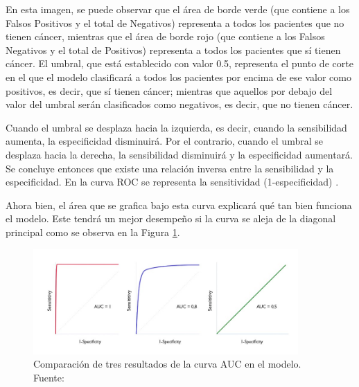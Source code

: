 \begin{itemize}
	En esta imagen, se puede observar que el área de borde verde (que contiene a los Falsos Positivos y el total de Negativos) representa a todos los pacientes que no tienen cáncer, mientras que el área de borde rojo (que contiene a los Falsos Negativos y el total de Positivos) representa a todos los pacientes que sí tienen cáncer. El umbral, que está establecido con valor 0.5, representa el punto de corte en el que el modelo clasificará a todos los pacientes por encima de ese valor como positivos, es decir, que sí tienen cáncer; mientras que aquellos por debajo del valor del umbral serán clasificados como negativos, es decir, que no tienen cáncer.
	
	Cuando el umbral se desplaza hacia la izquierda, es decir, cuando la sensibilidad aumenta, la especificidad disminuirá. Por el contrario, cuando el umbral se desplaza hacia la derecha, la sensibilidad disminuirá y la especificidad aumentará. Se concluye entonces que existe una relación inversa entre la sensibilidad y la especificidad. En la curva ROC se representa la sensitividad (1-especificidad) \parencite{gl_gonzalez2019auc}.
	
	Ahora bien, el área que se grafica bajo esta curva explicará qué tan bien funciona el modelo. Este tendrá un mejor desempeño si la curva se aleja de la diagonal principal como se observa en la Figura \ref{3:fig3}.
	
	\begin{figure}[htbp]
		\begin{center}
			\includegraphics[width=0.9\textwidth]{3/figures/auc_curves.jpg}
			\caption{Comparación de tres resultados de la curva AUC en el modelo. Fuente: \parencite{pr_molina2017pediatria_curvaroc}}
			\label{3:fig3}
		\end{center}
	\end{figure}
	

\end{itemize}
